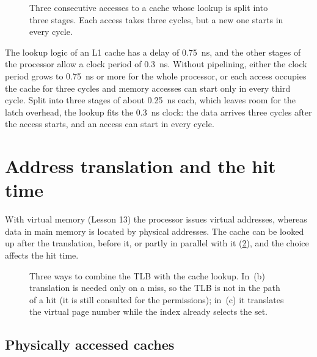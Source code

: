 \documentclass[../main.tex]{subfiles}
\begin{document}
\begin{figure}[htbp]
  \centering
  
  \caption{Three consecutive accesses to a cache whose lookup is split into
    three stages.  Each access takes three cycles, but a new one starts in
    every cycle.}
  \label{fig:l14-pipelined}
\end{figure}

\begin{example}
  \label{ex:l14-pipelined}
  The lookup logic of an L1 cache has a delay of \SI{0.75}{\nano\second},
  and the other stages of the processor allow a clock period of
  \SI{0.3}{\nano\second}.  Without pipelining, either the clock period grows
  to \SI{0.75}{\nano\second} or more for the whole processor, or each access
  occupies the cache for three cycles and memory accesses can start only in
  every third cycle.  Split into three stages of about
  \SI{0.25}{\nano\second} each, which leaves room for the latch overhead, the
  lookup fits the \SI{0.3}{\nano\second} clock: the data arrives three cycles
  after the access starts, and an access can start in every
  cycle.
\end{example}

\section{Address translation and the hit time}
\label{sec:l14-translation}

With virtual memory (Lesson 13) the processor issues virtual addresses,
whereas data in main memory is located by physical
addresses.  The cache can be
looked up after the translation, before it, or partly in parallel with it
(\cref{fig:l14-translation}), and the choice affects the hit time.

\begin{figure}[htbp]
  \centering
  
  \caption{Three ways to combine the TLB with the cache lookup.  In~(b)
    translation is needed only on a miss, so the TLB is not in the path of a
    hit (it is still consulted for the permissions); in~(c) it translates the
    virtual page number while the index already selects the set.}
  \label{fig:l14-translation}
\end{figure}

\subsection{Physically accessed caches}
\end{document}

